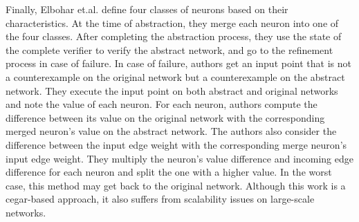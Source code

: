 Finally, Elbohar et.al. \cite{elboher2020abstraction} define four classes of neurons based on their 
characteristics.
At the time of abstraction, they merge each neuron into one of the four classes.  
After completing the abstraction process, they use the state of the complete verifier to verify  
the abstract network, and go to the refinement process in case of failure. 
In case of failure,  authors get an input point that is not a counterexample on the original network 
but a counterexample on the abstract network. They execute the input point on both abstract and original networks and 
note the value of each neuron. For each neuron, authors compute the difference between its value on the original
network with the corresponding merged neuron's value on the abstract network. The authors also consider the difference between the input edge weight with the corresponding
merge neuron's input edge weight. They multiply the neuron's value difference and incoming edge difference
for each neuron and split the one with a higher value. In the worst case, this method may get back to the original network.
Although this work is a cegar-based approach, 
it also suffers from scalability issues on large-scale networks.   



